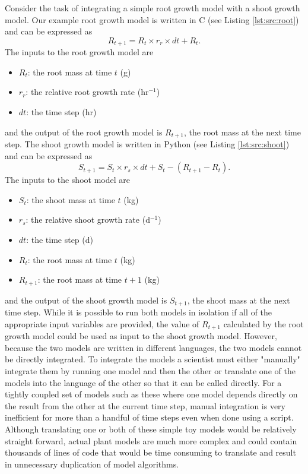 \documentclass[journal]{IEEEtran}
\begin{document}
Consider the task of integrating a simple root growth model with a shoot growth model. Our example root growth model is written in C (see Listing \ref{lst:src:root}) and can be expressed as
\begin{equation}
R_{t+1} = R_{t} \times r_{r} \times dt + R_{t}.
\end{equation}
The inputs to the root growth model are
\begin{itemize}
	\item $R_{t}$: the root mass at time $t$ (g)
	\item $r_{r}$: the relative root growth rate (hr$^{-1}$)
	\item $dt$: the time step (hr)
\end{itemize}
and the output of the root growth model is $R_{t+1}$, the root mass at the next time step. 
%
The shoot growth model is written in Python (see Listing \ref{lst:src:shoot}) and can be expressed as
\begin{equation}
S_{t+1} = S_{t} \times r_{s} \times dt + S_{t} - (R_{t+1} - R_{t}).
\end{equation}
The inputs to the shoot model are 
\begin{itemize}
	\item $S_{t}$: the shoot mass at time $t$ (kg)
	\item $r_{s}$: the relative shoot growth rate (d$^{-1}$)
	\item $dt$: the time step (d)
	\item $R_{t}$: the root mass at time $t$ (kg)
	\item $R_{t+1}$: the root mass at time $t+1$ (kg)
\end{itemize}
and the output of the shoot growth model is $S_{t+1}$, the shoot mass at the next time step.
%
While it is possible to run both models in isolation if all of the appropriate input variables are provided, the value of $R_{t+1}$ calculated by the root growth model could be used as input to the shoot growth model. However, because the two models are written in different languages, the two models cannot be directly integrated. To integrate the models a scientist must either "manually" integrate them by running one model and then the other or translate one of the models into the language of the other so that it can be called directly. For a tightly coupled set of models such as these where one model depends directly on the result from the other at the current time step, manual integration is very inefficient for more than a handful of time steps even when done using a script. Although translating one or both of these simple toy models would be relatively straight forward, actual plant models are much more complex and could contain thousands of lines of code that would be time consuming to translate and result in unnecessary duplication of model algorithms.
\end{document}
